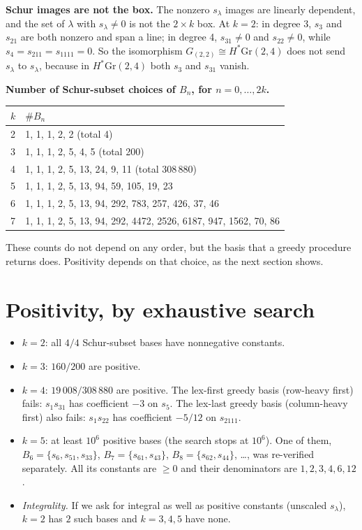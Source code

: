 \documentclass[10pt]{amsart}
\begin{document}
\textbf{Schur images are not the box.} The nonzero $s_\lambda$ images are linearly dependent, and the set of
$\lambda$ with $s_\lambda\ne0$ is not the $2\times k$ box. At $k=2$: in degree 3, $s_3$ and $s_{21}$ are both
nonzero and span a line; in degree 4, $s_{31}\neq0$ and $s_{22}\ne0$, while $s_4=s_{211}=s_{1111}=0$.
So the isomorphism $G_{(2,2)}\cong H^*\mathrm{Gr}(2,4)$ does not send $s_\lambda$ to $s_\lambda$, because in
$H^*\mathrm{Gr}(2,4)$ both $s_3$ and $s_{31}$ vanish.

\textbf{Number of Schur-subset choices of $B_n$, for $n=0,\dots,2k$.}
\begin{center}\small
\begin{tabular}{@{}ll@{}}
\toprule
$k$ & $\#B_n$ \\ \midrule
2 & 1, 1, 1, 2, 2 \quad(total 4)\\
3 & 1, 1, 1, 2, 5, 4, 5 \quad(total 200)\\
4 & 1, 1, 1, 2, 5, 13, 24, 9, 11 \quad(total 308\,880)\\
5 & 1, 1, 1, 2, 5, 13, 94, 59, 105, 19, 23\\
6 & 1, 1, 1, 2, 5, 13, 94, 292, 783, 257, 426, 37, 46\\
7 & 1, 1, 1, 2, 5, 13, 94, 292, 4472, 2526, 6187, 947, 1562, 70, 86\\
\bottomrule
\end{tabular}
\end{center}
These counts do not depend on any order, but the basis that a greedy procedure returns does. Positivity
depends on that choice, as the next section shows.

\section{Positivity, by exhaustive search}
\begin{itemize}[leftmargin=1.3em,itemsep=2pt]
\item $k=2$: all $4/4$ Schur-subset bases have nonnegative constants.
\item $k=3$: $160/200$ are positive.
\item $k=4$: $19\,008/308\,880$ are positive. The lex-first greedy basis (row-heavy first) fails:
  $s_1s_{31}$ has coefficient $-3$ on $s_5$. The lex-last greedy basis (column-heavy first) also fails:
  $s_1s_{22}$ has coefficient $-5/12$ on $s_{2111}$.
\item $k=5$: at least $10^6$ positive bases (the search stops at $10^6$). One of them,
  $B_6=\{s_6,s_{51},s_{33}\}$, $B_7=\{s_{61},s_{43}\}$, $B_8=\{s_{62},s_{44}\}$, \dots, was re-verified
  separately. All its constants are $\ge0$ and their denominators are $1,2,3,4,6,12$.
\item \emph{Integrality.} If we ask for integral as well as positive constants (unscaled $s_\lambda$), $k=2$
  has $2$ such bases and $k=3,4,5$ have none.
\end{itemize}
\end{document}
